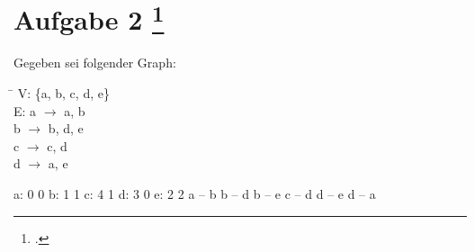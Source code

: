 \documentclass{lehramt-informatik-aufgabe}
\begin{document}
\section{Aufgabe 2
\footcite{46114:2008:09}}

Gegeben sei folgender Graph:

\begin{tabbing}
\hspace{1cm} \= \hspace{3cm} \kill
V: \> \{a, b, c, d, e\} \\
E: \> a $\rightarrow$ a, b \\
\> b $\rightarrow$ b, d, e \\
\> c $\rightarrow$ c, d \\
\> d $\rightarrow$ a, e \\
\end{tabbing}

\begin{liEinfachesGraphenFormat}
a: 0 0
b: 1 1
c: 4 1
d: 3 0
e: 2 2
a -- b
b -- d
b -- e
c -- d
d -- e
d -- a
\end{liEinfachesGraphenFormat}
\end{document}
